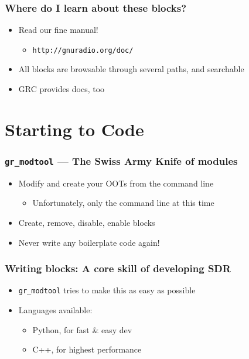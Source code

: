 \documentclass{beamer}
\begin{document}
\begin{frame}
  \frametitle{Where do I learn about these blocks?}
  \begin{itemize}
    \item Read our fine manual!
      \begin{itemize}
        \item \texttt{http://gnuradio.org/doc/}
      \end{itemize}
    \item All blocks are browsable through several paths, and searchable
    \item GRC provides docs, too
  \end{itemize}
\end{frame}

\section{Starting to Code}
\begin{frame}[fragile]
  \frametitle{\texttt{gr\_modtool} --- The Swiss Army Knife of modules}
  \begin{itemize}
    \item Modify and create your OOTs from the command line
      \begin{itemize}
        \item Unfortunately, only the command line at this time
      \end{itemize}
    \item Create, remove, disable, enable blocks
    \item Never write any boilerplate code again!
  \end{itemize}
\end{frame}

\begin{frame}
  \frametitle{Writing blocks: A core skill of developing SDR}
  \begin{itemize}
    \item \texttt{gr\_modtool} tries to make this as easy as possible
    \item Languages available:
      \begin{itemize}
        \item Python, for fast \& easy dev
        \item C++, for highest performance
      \end{itemize}
  \end{itemize}
\end{frame}
\end{document}
